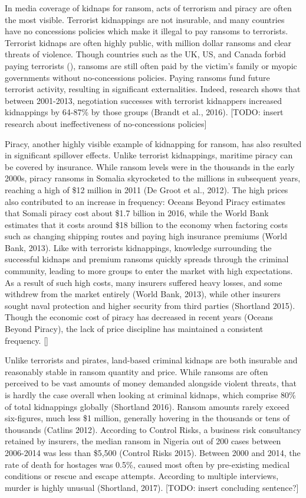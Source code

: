 \documentclass[12pt]{article}
\theoremstyle{plain}
\begin{document}
In media coverage of kidnaps for ransom, acts of terrorism and piracy are often the most visible. Terrorist kidnappings are not insurable, and many countries have no concessions policies which make it illegal to pay ransoms to terrorists. Terrorist kidnaps are often highly public, with million dollar ransoms and clear threats of violence. Though countries such as the UK, US, and Canada forbid paying terrorists (), ransoms are still often paid by the victim's family or myopic governments without no-concessions policies. Paying ransoms fund future terrorist activity, resulting in significant externalities. Indeed, research shows that between 2001-2013, negotiation successes with terrorist kidnappers increased kidnappings by 64-87\% by those groups (Brandt et al., 2016). [TODO: insert research about ineffectiveness of no-concessions policies] 

Piracy, another highly visible example of kidnapping for ransom, has also resulted in significant spillover effects. Unlike terrorist kidnappings, maritime piracy can be covered by insurance. While ransom levels were in the thousands in the early 2000s, piracy ransoms in Somalia skyrocketed to the millions in subsequent years, reaching a high of \$12 million in 2011 (De Groot et al., 2012). The high prices also contributed to an increase in frequency: Oceans Beyond Piracy estimates that Somali piracy cost about \$1.7 billion in 2016, while the World Bank estimates that it costs around \$18 billion to the economy when factoring costs such as changing shipping routes and paying high insurance premiums (World Bank, 2013). Like with terrorists kidnappings, knowledge surrounding the successful kidnaps and premium ransoms quickly spreads through the criminal community, leading to more groups to enter the market with high expectations. As a result of such high costs, many insurers suffered heavy losses, and some withdrew from the market entirely (World Bank, 2013), while other insurers sought naval protection and higher security from third parties (Shortland 2015). Though the economic cost of piracy has decreased in recent years (Oceans Beyond Piracy), the lack of price discipline has maintained a consistent frequency. []

Unlike terrorists and pirates, land-based criminal kidnaps are both insurable and reasonably stable in ransom quantity and price. While ransoms are often perceived to be vast amounts of money demanded alongside violent threats, that is hardly the case overall when looking at criminal kidnaps, which comprise 80\% of total kidnappings globally (Shortland 2016). Ransom amounts rarely exceed six-figures, much less \$1 million, generally hovering in the thousands or tens of thousands (Catlins 2012). According to Control Risks, a business risk consultancy retained by insurers, the median ransom in Nigeria out of 200 cases between 2006-2014 was less than \$5,500 (Control Risks 2015). Between 2000 and 2014, the rate of death for hostages was 0.5\%, caused most often by pre-existing medical conditions or rescue and escape attempts. According to multiple interviews, murder is highly unusual (Shortland, 2017). [TODO: insert concluding sentence?]
\end{document}
